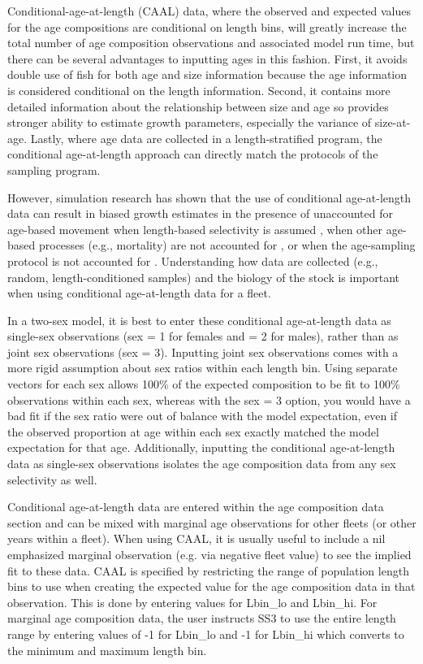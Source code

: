 Conditional-age-at-length (CAAL) data, where the observed and expected values for the age compositions are conditional on length bins, will greatly increase the total number of age composition observations and associated model run time, but there can be several advantages to inputting ages in this fashion. First, it avoids double use of fish for both age and size information because the age information is considered conditional on the length information. Second, it contains more detailed information about the relationship between size and age so provides stronger ability to estimate growth parameters, especially the variance of size-at-age. Lastly, where age data are collected in a length-stratified program, the conditional age-at-length approach can directly match the protocols of the sampling program.

However, simulation research has shown that the use of conditional age-at-length data can result in biased growth estimates in the presence of unaccounted for age-based movement when length-based selectivity is assumed \citep{lee-effects-2017}, when other age-based processes (e.g., mortality) are not accounted for \citep{lee-use-2019}, or when the age-sampling protocol is not accounted for \citep{piner-evaluation-2016}. Understanding how data are collected (e.g., random, length-conditioned samples) and the biology of the stock is important when using conditional age-at-length data for a fleet.     

In a two-sex model, it is best to enter these conditional age-at-length data as single-sex observations (sex = 1 for females and = 2 for males), rather than as joint sex observations (sex = 3). Inputting joint sex observations comes with a more rigid assumption about sex ratios within each length bin. Using separate vectors for each sex allows 100\% of the expected composition to be fit to 100\% observations within each sex, whereas with the sex = 3 option, you would have a bad fit if the sex ratio were out of balance with the model expectation, even if the observed proportion at age within each sex exactly matched the model expectation for that age. Additionally, inputting the conditional age-at-length data as single-sex observations isolates the age composition data from any sex selectivity as well.

Conditional age-at-length data are entered within the age composition data section and can be mixed with marginal age observations for other fleets (or other years within a fleet). When using CAAL, it is usually useful to include a nil emphasized marginal observation (e.g. via negative fleet value) to see the implied fit to these data. CAAL is specified by restricting the range of population length bins to use when creating the expected value for the age composition data in that observation. This is done by entering values for Lbin\_lo and Lbin\_hi. For marginal age composition data, the user instructs SS3 to use the entire length range by entering values of -1 for Lbin\_lo and -1 for Lbin\_hi which converts to the minimum and maximum length bin.

